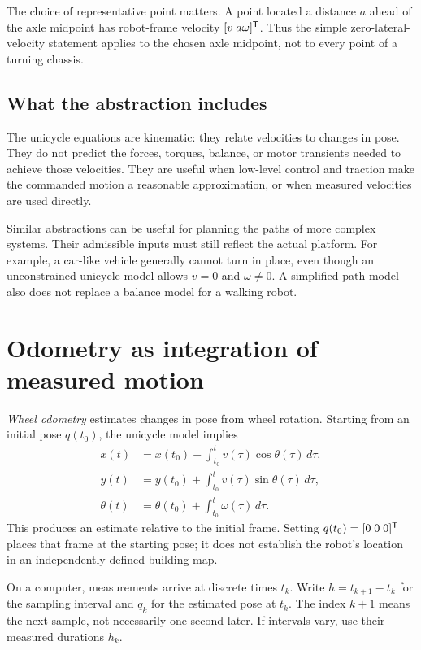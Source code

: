 The choice of representative point matters. A point located a distance $a$
ahead of the axle midpoint has robot-frame velocity $[v\;a\omega]^{\mathsf T}$.
Thus the simple zero-lateral-velocity statement applies to the chosen axle
midpoint, not to every point of a turning chassis.

\subsection{What the abstraction includes}
The unicycle equations are kinematic: they relate velocities to changes
in pose. They do not predict the forces, torques, balance, or motor transients
needed to achieve those velocities. They are useful when low-level control
and traction make the commanded motion a reasonable approximation, or when
measured velocities are used directly.

Similar abstractions can be useful for planning the paths of more complex
systems. Their admissible inputs must still reflect the actual platform.
For example, a car-like vehicle generally cannot turn in place, even though
an unconstrained unicycle model allows $v=0$ and $\omega\ne0$. A simplified
path model also does not replace a balance model for a walking robot.

\section{Odometry as integration of measured motion}
\emph{Wheel odometry} estimates changes in pose from wheel rotation.
Starting from an initial pose $q(t_0)$, the unicycle model implies
\begin{align}
 x(t)&=x(t_0)+\int_{t_0}^t v(\tau)\cos\theta(\tau)\,d\tau,\\
 y(t)&=y(t_0)+\int_{t_0}^t v(\tau)\sin\theta(\tau)\,d\tau,\\
 \theta(t)&=\theta(t_0)+\int_{t_0}^t\omega(\tau)\,d\tau.
\end{align}
This produces an estimate relative to the initial frame. Setting
$q(t_0)=[0\;0\;0]^{\mathsf T}$ places that frame at the starting pose; it does
not establish the robot's location in an independently defined building map.

On a computer, measurements arrive at discrete times $t_k$. Write
$h=t_{k+1}-t_k$ for the sampling interval and $q_k$ for the estimated pose
at $t_k$. The index $k+1$ means the next sample, not necessarily one second
later. If intervals vary, use their measured durations $h_k$.

